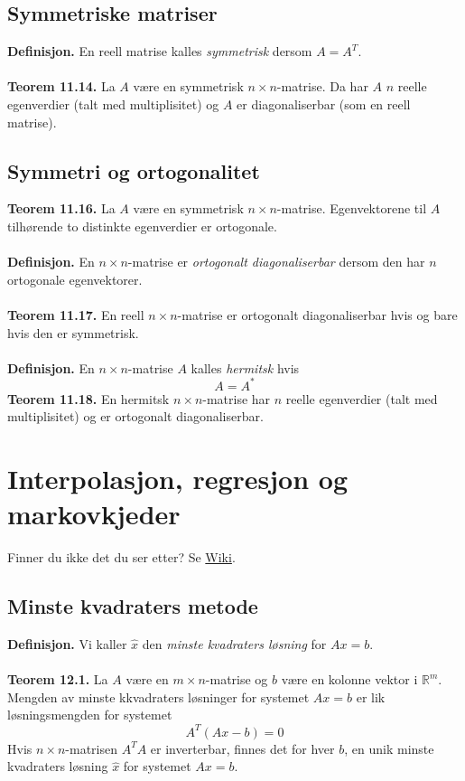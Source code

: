 \documentclass{article}
\begin{document}
\subsection{Symmetriske matriser}
\textbf{Definisjon.} En reell matrise kalles \textit{symmetrisk} dersom $A = A^T$.
\\\\
\textbf{Teorem 11.14.} La $A$ være en symmetrisk $n \times n$-matrise. Da har $A$ $n$ reelle egenverdier (talt med multiplisitet) og $A$ er diagonaliserbar (som en reell matrise).


\subsection{Symmetri og ortogonalitet}
\textbf{Teorem 11.16.} La $A$ være en symmetrisk $n \times n$-matrise. Egenvektorene til $A$ tilhørende to distinkte egenverdier er ortogonale.
\\\\
\textbf{Definisjon.} En $n \times n$-matrise er \textit{ortogonalt diagonaliserbar} dersom den har $n$ ortogonale egenvektorer.
\\\\
\textbf{Teorem 11.17.} En reell $n \times n$-matrise er ortogonalt diagonaliserbar hvis og bare hvis den er symmetrisk.
\\\\
\textbf{Definisjon.} En $n \times n$-matrise $A$ kalles \textit{hermitsk} hvis
\[ A = A^* \]
\textbf{Teorem 11.18.} En hermitsk $n \times n$-matrise har $n$ reelle egenverdier (talt med multiplisitet) og er ortogonalt diagonaliserbar.




\clearpage
\section{Interpolasjon, regresjon og markovkjeder}
Finner du ikke det du ser etter? Se \href{https://www.math.ntnu.no/emner/TMA4110/2020h/notater/12\%20-\%20Interpolasjon,\%20regresjon\%20og\%20markovkjeder.pdf}{Wiki}.


\subsection{Minste kvadraters metode}
\textbf{Definisjon.} Vi kaller $\hat{x}$ den \textit{minste kvadraters løsning} for $Ax = b$.
\\\\
\textbf{Teorem 12.1.} La $A$ være en $m \times n$-matrise og $b$ være en kolonne vektor i $\mathbb{R}^m$. Mengden av minste kkvadraters løsninger for systemet $Ax = b$ er lik løsningsmengden for systemet
\[ A^T(Ax-b)=0 \]
Hvis $n \times n$-matrisen $A^TA$ er inverterbar, finnes det for hver $b$, en unik minste kvadraters løsning $\hat{x}$ for systemet $Ax = b$.
\end{document}
